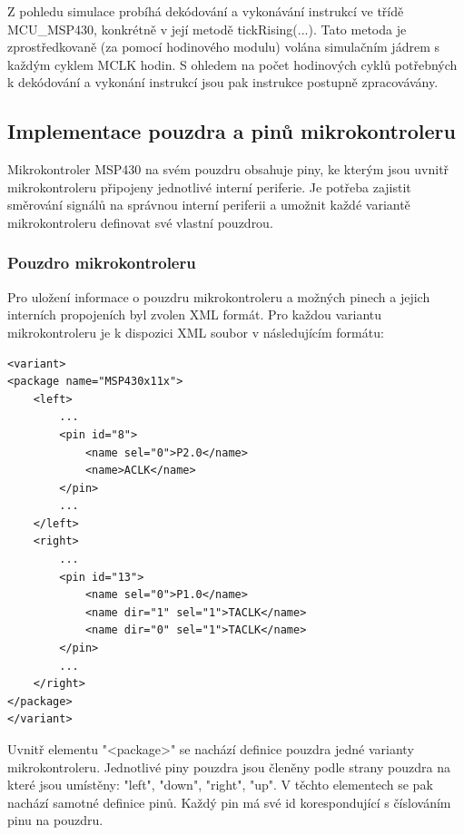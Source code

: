 Z pohledu simulace probíhá dekódování a vykonávání instrukcí ve třídě MCU\_MSP430, konkrétně v její metodě tickRising(...). Tato metoda je zprostředkovaně (za pomocí hodinového modulu) volána simulačním jádrem s každým cyklem MCLK hodin. S ohledem na počet hodinových cyklů potřebných k dekódování a vykonání instrukcí jsou pak instrukce postupně zpracovávány.

\subsection{Implementace pouzdra a pinů mikrokontroleru}

Mikrokontroler MSP430 na svém pouzdru obsahuje piny, ke kterým jsou uvnitř mikrokontroleru připojeny jednotlivé interní periferie. Je potřeba zajistit směrování signálů na správnou interní periferii a umožnit každé variantě mikrokontroleru definovat své vlastní pouzdrou.

\subsubsection{Pouzdro mikrokontroleru}

Pro uložení informace o pouzdru mikrokontroleru a možných pinech a jejich interních propojeních byl zvolen XML formát. Pro každou variantu mikrokontroleru je k dispozici XML soubor v následujícím formátu:
\begin{lstlisting}
<variant>
<package name="MSP430x11x">
	<left>
		...
		<pin id="8">
			<name sel="0">P2.0</name>
			<name>ACLK</name>
		</pin>
		...
	</left>
	<right>
		...
		<pin id="13">
			<name sel="0">P1.0</name>
			<name dir="1" sel="1">TACLK</name>
			<name dir="0" sel="1">TACLK</name>
		</pin>
		...
	</right>
</package>
</variant>
\end{lstlisting}

Uvnitř elementu "<package>" se nachází definice pouzdra jedné varianty mikrokontroleru. Jednotlivé piny pouzdra jsou členěny podle strany pouzdra na které jsou umístěny: "left", "down", "right", "up". V těchto elementech se pak nachází samotné definice pinů. Každý pin má své id korespondující s číslováním pinu na pouzdru.

